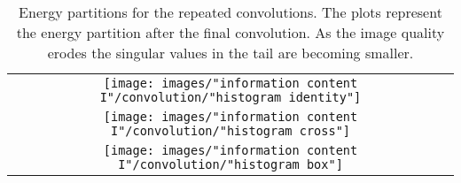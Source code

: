 \begin{table}[htdp]
\caption[Energy partitions for the repeated convolutions]{Energy partitions for the repeated convolutions. The plots represent the energy partition after the final convolution. As the image quality erodes the singular values in the tail are becoming smaller.}
\begin{center}
\begin{tabular}{c}
%
 \texttt{[image: images/"information content I"/convolution/"histogram identity"]} \\[15pt]
%
 \texttt{[image: images/"information content I"/convolution/"histogram cross"]} \\[15pt]
%
 \texttt{[image: images/"information content I"/convolution/"histogram box"]}
%
\end{tabular}
\end{center}
\label{default}
\end{table}%

\endinput